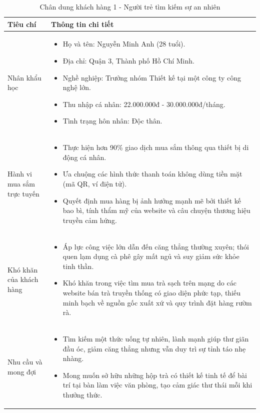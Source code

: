 \begin{table}[H]
\centering
\caption{Chân dung khách hàng 1 - Người trẻ tìm kiếm sự an nhiên}
\label{tab:persona1}
\begin{tabular}{p{3.5cm}p{11.5cm}}
\toprule
\textbf{Tiêu chí} & \textbf{Thông tin chi tiết} \\ \midrule
Nhân khẩu học & 
\begin{itemize}
    \item Họ và tên: Nguyễn Minh Anh (28 tuổi).
    \item Địa chỉ: Quận 3, Thành phố Hồ Chí Minh.
    \item Nghề nghiệp: Trưởng nhóm Thiết kế tại một công ty công nghệ lớn.
    \item Thu nhập cá nhân: 22.000.000đ - 30.000.000đ/tháng.
    \item Tình trạng hôn nhân: Độc thân.
\end{itemize} \\ \addlinespace
Hành vi mua sắm trực tuyến & 
\begin{itemize}
    \item Thực hiện hơn 90\% giao dịch mua sắm thông qua thiết bị di động cá nhân.
    \item Ưa chuộng các hình thức thanh toán không dùng tiền mặt (mã QR, ví điện tử).
    \item Quyết định mua hàng bị ảnh hưởng mạnh mẽ bởi thiết kế bao bì, tính thẩm mỹ của website và câu chuyện thương hiệu truyền cảm hứng.
\end{itemize} \\ \addlinespace
Khó khăn của khách hàng & 
\begin{itemize}
    \item Áp lực công việc lớn dẫn đến căng thẳng thường xuyên; thói quen lạm dụng cà phê gây mất ngủ và suy giảm sức khỏe tinh thần.
    \item Khó khăn trong việc tìm mua trà sạch trên mạng do các website bán trà truyền thống có giao diện phức tạp, thiếu minh bạch về nguồn gốc xuất xứ và quy trình đặt hàng rườm rà.
\end{itemize} \\ \addlinespace
Nhu cầu và mong đợi & 
\begin{itemize}
    \item Tìm kiếm một thức uống tự nhiên, lành mạnh giúp thư giãn đầu óc, giảm căng thẳng nhưng vẫn duy trì sự tỉnh táo nhẹ nhàng.
    \item Mong muốn sở hữu những hộp trà có thiết kế tinh tế để bài trí tại bàn làm việc văn phòng, tạo cảm giác thư thái mỗi khi thưởng thức.
\end{itemize} \\ \bottomrule
\end{tabular}
\end{table}

